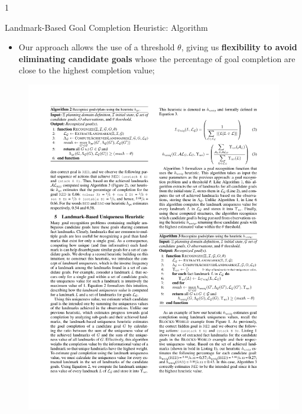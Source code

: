 \documentclass{beamer}
\def\masterclass{1}
\begin{document}

\if\masterclass1
    \begin{frame}{Landmark-Based Goal Completion Heuristic: Algorithm}
		\begin{itemize}
			\item Our approach allows the use of a threshold $\theta$, giving us \textbf{flexibility to avoid eliminating candidate goals} whose the percentage of goal completion are close to the highest completion value;
		\end{itemize}
		
		\begin{figure}[here]
			\centering
			\includegraphics[width=0.8\linewidth]{algo2-heuristic_goalcompletion.pdf}
		\end{figure}	
	\end{frame}	
\fi

\end{document}

